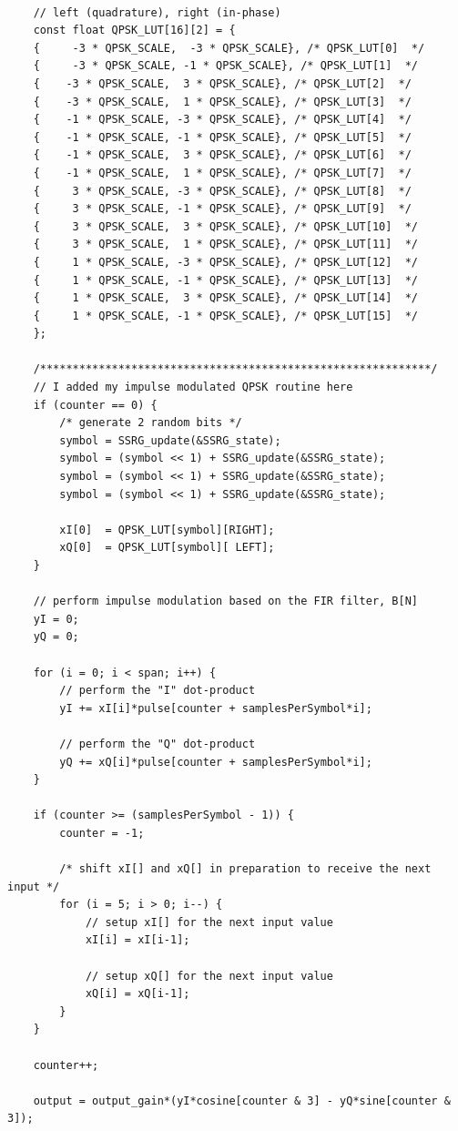 \documentclass{article}
\begin{document}
\begin{verbatim}

	// left (quadrature), right (in-phase)
	const float QPSK_LUT[16][2] = {
	{     -3 * QPSK_SCALE,  -3 * QPSK_SCALE}, /* QPSK_LUT[0]  */
	{     -3 * QPSK_SCALE, -1 * QPSK_SCALE}, /* QPSK_LUT[1]  */
	{    -3 * QPSK_SCALE,  3 * QPSK_SCALE}, /* QPSK_LUT[2]  */
	{    -3 * QPSK_SCALE,  1 * QPSK_SCALE}, /* QPSK_LUT[3]  */
	{    -1 * QPSK_SCALE, -3 * QPSK_SCALE}, /* QPSK_LUT[4]  */
	{    -1 * QPSK_SCALE, -1 * QPSK_SCALE}, /* QPSK_LUT[5]  */
	{    -1 * QPSK_SCALE,  3 * QPSK_SCALE}, /* QPSK_LUT[6]  */
	{    -1 * QPSK_SCALE,  1 * QPSK_SCALE}, /* QPSK_LUT[7]  */
	{     3 * QPSK_SCALE, -3 * QPSK_SCALE}, /* QPSK_LUT[8]  */
	{     3 * QPSK_SCALE, -1 * QPSK_SCALE}, /* QPSK_LUT[9]  */
	{     3 * QPSK_SCALE,  3 * QPSK_SCALE}, /* QPSK_LUT[10]  */
	{     3 * QPSK_SCALE,  1 * QPSK_SCALE}, /* QPSK_LUT[11]  */
	{     1 * QPSK_SCALE, -3 * QPSK_SCALE}, /* QPSK_LUT[12]  */
	{     1 * QPSK_SCALE, -1 * QPSK_SCALE}, /* QPSK_LUT[13]  */
	{     1 * QPSK_SCALE,  3 * QPSK_SCALE}, /* QPSK_LUT[14]  */
	{     1 * QPSK_SCALE, -1 * QPSK_SCALE}, /* QPSK_LUT[15]  */
	};

	/************************************************************/
	// I added my impulse modulated QPSK routine here
	if (counter == 0) {
		/* generate 2 random bits */
		symbol = SSRG_update(&SSRG_state); 
		symbol = (symbol << 1) + SSRG_update(&SSRG_state);
		symbol = (symbol << 1) + SSRG_update(&SSRG_state);
		symbol = (symbol << 1) + SSRG_update(&SSRG_state);

		xI[0]  = QPSK_LUT[symbol][RIGHT];  
		xQ[0]  = QPSK_LUT[symbol][ LEFT];   
	}

	// perform impulse modulation based on the FIR filter, B[N]
	yI = 0;
	yQ = 0;

	for (i = 0; i < span; i++) {
		// perform the "I" dot-product
		yI += xI[i]*pulse[counter + samplesPerSymbol*i];	

		// perform the "Q" dot-product
		yQ += xQ[i]*pulse[counter + samplesPerSymbol*i];	
	}

	if (counter >= (samplesPerSymbol - 1)) {
		counter = -1; 

		/* shift xI[] and xQ[] in preparation to receive the next input */
		for (i = 5; i > 0; i--) {
			// setup xI[] for the next input value
			xI[i] = xI[i-1];  

			// setup xQ[] for the next input value
			xQ[i] = xQ[i-1];  
		}
	}

	counter++;

	output = output_gain*(yI*cosine[counter & 3] - yQ*sine[counter & 3]);
\end{verbatim}
\end{document}
